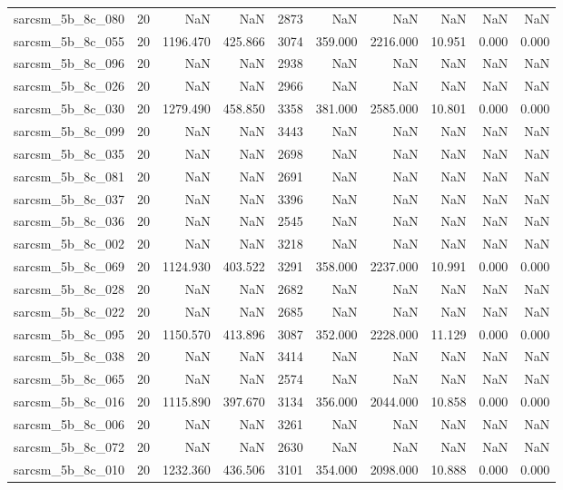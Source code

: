 \begin{tabular}{lrrrrrrrrr}
sarcsm\_5b\_8c\_080 & 20 & NaN & NaN & 2873 & NaN & NaN & NaN & NaN & NaN \\
sarcsm\_5b\_8c\_055 & 20 & 1196.470 & 425.866 & 3074 & 359.000 & 2216.000 & 10.951 & 0.000 & 0.000 \\
sarcsm\_5b\_8c\_096 & 20 & NaN & NaN & 2938 & NaN & NaN & NaN & NaN & NaN \\
sarcsm\_5b\_8c\_026 & 20 & NaN & NaN & 2966 & NaN & NaN & NaN & NaN & NaN \\
sarcsm\_5b\_8c\_030 & 20 & 1279.490 & 458.850 & 3358 & 381.000 & 2585.000 & 10.801 & 0.000 & 0.000 \\
sarcsm\_5b\_8c\_099 & 20 & NaN & NaN & 3443 & NaN & NaN & NaN & NaN & NaN \\
sarcsm\_5b\_8c\_035 & 20 & NaN & NaN & 2698 & NaN & NaN & NaN & NaN & NaN \\
sarcsm\_5b\_8c\_081 & 20 & NaN & NaN & 2691 & NaN & NaN & NaN & NaN & NaN \\
sarcsm\_5b\_8c\_037 & 20 & NaN & NaN & 3396 & NaN & NaN & NaN & NaN & NaN \\
sarcsm\_5b\_8c\_036 & 20 & NaN & NaN & 2545 & NaN & NaN & NaN & NaN & NaN \\
sarcsm\_5b\_8c\_002 & 20 & NaN & NaN & 3218 & NaN & NaN & NaN & NaN & NaN \\
sarcsm\_5b\_8c\_069 & 20 & 1124.930 & 403.522 & 3291 & 358.000 & 2237.000 & 10.991 & 0.000 & 0.000 \\
sarcsm\_5b\_8c\_028 & 20 & NaN & NaN & 2682 & NaN & NaN & NaN & NaN & NaN \\
sarcsm\_5b\_8c\_022 & 20 & NaN & NaN & 2685 & NaN & NaN & NaN & NaN & NaN \\
sarcsm\_5b\_8c\_095 & 20 & 1150.570 & 413.896 & 3087 & 352.000 & 2228.000 & 11.129 & 0.000 & 0.000 \\
sarcsm\_5b\_8c\_038 & 20 & NaN & NaN & 3414 & NaN & NaN & NaN & NaN & NaN \\
sarcsm\_5b\_8c\_065 & 20 & NaN & NaN & 2574 & NaN & NaN & NaN & NaN & NaN \\
sarcsm\_5b\_8c\_016 & 20 & 1115.890 & 397.670 & 3134 & 356.000 & 2044.000 & 10.858 & 0.000 & 0.000 \\
sarcsm\_5b\_8c\_006 & 20 & NaN & NaN & 3261 & NaN & NaN & NaN & NaN & NaN \\
sarcsm\_5b\_8c\_072 & 20 & NaN & NaN & 2630 & NaN & NaN & NaN & NaN & NaN \\
sarcsm\_5b\_8c\_010 & 20 & 1232.360 & 436.506 & 3101 & 354.000 & 2098.000 & 10.888 & 0.000 & 0.000 \\

\end{tabular}
